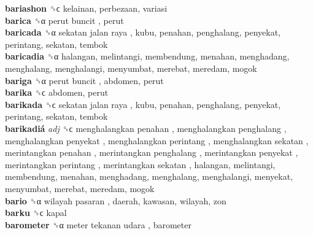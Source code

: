 \textbf{bariashon} ␝ϲ  kelainan, perbezaan, variasi  \\
\textbf{barica} ␝α   perut buncit , perut  \\
\textbf{baricada} ␝α   sekatan jalan raya , kubu, penahan, penghalang, penyekat, perintang, sekatan, tembok  \\
\textbf{baricadia} ␝α  halangan, melintangi, membendung, menahan, menghadang, menghalang, menghalangi, menyumbat, merebat, meredam, mogok  \\
\textbf{bariga} ␝α   perut buncit , abdomen, perut  \\
\textbf{barika} ␝ϲ  abdomen, perut  \\
\textbf{barikada} ␝ϲ   sekatan jalan raya , kubu, penahan, penghalang, penyekat, perintang, sekatan, tembok  \\
\textbf{barikadiá} \emph{adj}  ␝ϲ   menghalangkan penahan ,  menghalangkan penghalang ,  menghalangkan penyekat ,  menghalangkan perintang ,  menghalangkan sekatan ,  merintangkan penahan ,  merintangkan penghalang ,  merintangkan penyekat ,  merintangkan perintang ,  merintangkan sekatan , halangan, melintangi, membendung, menahan, menghadang, menghalang, menghalangi, menyekat, menyumbat, merebat, meredam, mogok  \\
\textbf{bario} ␝α   wilayah pasaran , daerah, kawasan, wilayah, zon  \\
\textbf{barku} ␝ϲ  kapal  \\
\textbf{barometer} ␝α   meter tekanan udara , barometer  \\
